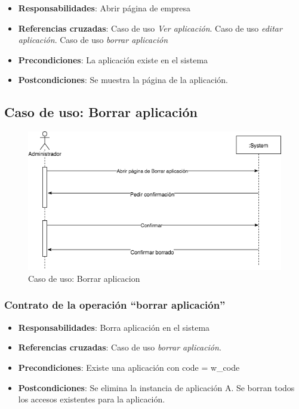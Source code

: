 \documentclass[12pt,a4paperpaper,]{report}
\providecommand{\tightlist}{%
  \setlength{\itemsep}{0pt}\setlength{\parskip}{0pt}}
\begin{document}
\begin{itemize}
\tightlist
\item
  \textbf{Responsabilidades}: Abrir página de empresa
\item
  \textbf{Referencias cruzadas}: Caso de uso \emph{Ver aplicación}. Caso
  de uso \emph{editar aplicación}. Caso de uso \emph{borrar aplicación}
\item
  \textbf{Precondiciones}: La aplicación existe en el sistema
\item
  \textbf{Postcondiciones}: Se muestra la página de la aplicación.
\end{itemize}

\subsection{Caso de uso: Borrar
aplicación}\label{caso-de-uso-borrar-aplicaciuxf3n-1}

\begin{figure}
\centering
\includegraphics{source/figures/secuencia-borrar-aplicacion.png}
\caption{Caso de uso: Borrar aplicacion
\label{secuencia_borrar_aplicacion}}
\end{figure}

\subsubsection{\texorpdfstring{Contrato de la operación ``borrar
aplicación''}{Contrato de la operación borrar aplicación}}\label{contrato-de-la-operaciuxf3n-borrar-aplicaciuxf3n}

\begin{itemize}
\tightlist
\item
  \textbf{Responsabilidades}: Borra aplicación en el sistema
\item
  \textbf{Referencias cruzadas}: Caso de uso \emph{borrar aplicación}.
\item
  \textbf{Precondiciones}: Existe una aplicación con code = w\_code
\item
  \textbf{Postcondiciones}: Se elimina la instancia de aplicación A. Se
  borran todos los accesos existentes para la aplicación.
\end{itemize}
\end{document}
